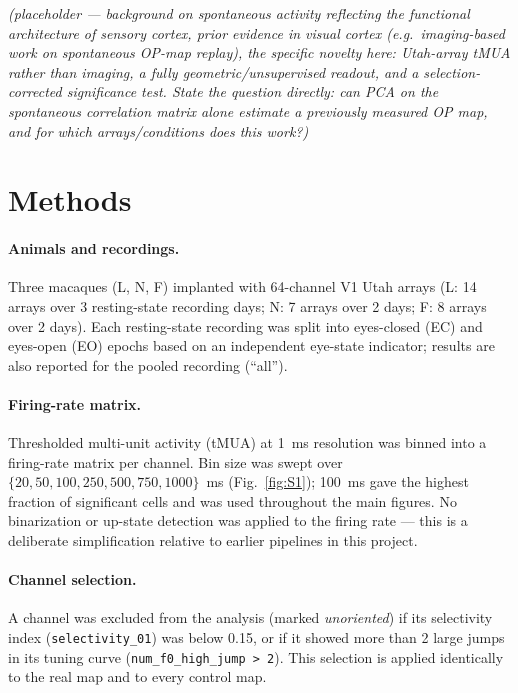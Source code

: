 \documentclass[11pt]{article}
\begin{document}
\emph{(placeholder --- background on spontaneous activity reflecting the
functional architecture of sensory cortex, prior evidence in visual cortex
(e.g.\ imaging-based work on spontaneous OP-map replay), the specific
novelty here: Utah-array tMUA rather than imaging, a fully
geometric/unsupervised readout, and a selection-corrected significance test.
State the question directly: can PCA on the spontaneous correlation matrix
alone estimate a previously measured OP map, and for which arrays/conditions
does this work?)}

\section{Methods}

\paragraph{Animals and recordings.}
Three macaques (L, N, F) implanted with 64-channel V1 Utah arrays (L: 14
arrays over 3 resting-state recording days; N: 7 arrays over 2 days; F: 8
arrays over 2 days). Each resting-state recording was split into
eyes-closed (EC) and eyes-open (EO) epochs based on an independent eye-state
indicator; results are also reported for the pooled recording (``all'').

\paragraph{Firing-rate matrix.}
Thresholded multi-unit activity (tMUA) at 1~ms resolution was binned into a
firing-rate matrix per channel. Bin size was swept over
$\{20, 50, 100, 250, 500, 750, 1000\}$~ms (Fig.~\ref{fig:S1}); 100~ms gave
the highest fraction of significant cells and was used throughout the main
figures. No binarization or up-state detection was applied to the firing
rate --- this is a deliberate simplification relative to earlier pipelines
in this project.

\paragraph{Channel selection.}
A channel was excluded from the analysis (marked \emph{unoriented}) if its
selectivity index (\texttt{selectivity\_01}) was below 0.15, or if it showed
more than 2 large jumps in its tuning curve (\texttt{num\_f0\_high\_jump >
2}). This selection is applied identically to the real map and to every
control map.
\end{document}
